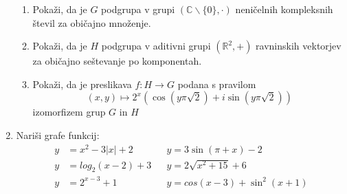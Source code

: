 \documentclass[a4paper,12pt]{article}
\begin{document}
\begin{enumerate}
{        \begin{enumerate}[label=(\alph*)]
            \item Pokaži, da je $G$ podgrupa v grupi $(\mathbb{C} \backslash \{0\}, \cdot)$
                    neničelnih kompleksnih števil za običajno množenje.
            \item Pokaži, da je $H$ podgrupa v aditivni grupi $(\mathbb{R}^2,+)$
                    ravninskih vektorjev za običajno seštevanje po komponentah.
            \item Pokaži, da je preslikava $f: H \rightarrow G$ podana s pravilom
            \[
                (x,y) \mapsto 2^x(\cos(y\pi\sqrt{2}) + i\sin(y\pi\sqrt{2}))
            \]
                    izomorfizem grup $G$ in $H$
        \end{enumerate}
    }

    \item{
        Nariši grafe funkcij:
        \begin{align}
            y &= x^2 - 3\left|x\right| + 2 && y = 3\sin(\pi + x) - 2 \nonumber \\
            y &= log_2(x - 2) + 3          && y = 2\sqrt{x^2 + 15} + 6 \nonumber \\
            y &= 2^{x-3} + 1               && y = cos(x-3) + \sin^2(x+1) \nonumber
        \end{align}
    }

\end{enumerate} 
\end{document}
